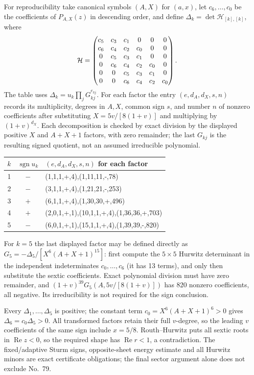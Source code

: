 \documentclass[11pt]{amsart}
\theoremstyle{remark}
\begin{document}
For reproducibility take canonical symbols $(A,X)$ for $(a,x)$, let $c_6,\ldots,c_0$ be the coefficients of $P_{A,X}(z)$ in descending order, and define $\Delta_k=\det\mathcal H_{[k],[k]}$, where
\[
\mathcal H=\begin{pmatrix}c_5&c_3&c_1&0&0&0\cr c_6&c_4&c_2&c_0&0&0\cr 0&c_5&c_3&c_1&0&0\cr 0&c_6&c_4&c_2&c_0&0\cr 0&0&c_5&c_3&c_1&0\cr 0&0&c_6&c_4&c_2&c_0\end{pmatrix}.
\]
The table uses $\Delta_k=u_k\prod_jG_{kj}^{e_{kj}}$. For each factor the entry $(e,d_A,d_X,s,n)$ records its multiplicity, degrees in $A,X$, common sign $s$, and number $n$ of nonzero coefficients after substituting $X=5v/[8(1+v)]$ and multiplying by $(1+v)^{d_X}$. Each decomposition is checked by exact division by the displayed positive $X$ and $A+X+1$ factors, with zero remainder; the last $G_{kj}$ is the resulting signed quotient, not an assumed irreducible polynomial.
\begin{center}\footnotesize
\begin{tabular}{c c p{9.4cm}}
$k$ & $\operatorname{sgn}u_k$ & $(e,d_A,d_X,s,n)$ for each factor 
\\
\hline
1 & $-$ & (1,1,1,+,4),(1,11,11,-,78) 
\\
2 & $-$ & (3,1,1,+,4),(1,21,21,-,253) 
\\
3 & $+$ & (6,1,1,+,4),(1,30,30,+,496) 
\\
4 & $+$ & (2,0,1,+,1),(10,1,1,+,4),(1,36,36,+,703) 
\\
5 & $-$ & (6,0,1,+,1),(15,1,1,+,4),(1,39,39,-,820) 
\\
\end{tabular}
\end{center}
For $k=5$ the last displayed factor may be defined directly as $G_5=-\Delta_5/[X^6(A+X+1)^{15}]$: first compute the $5\times5$ Hurwitz determinant in the independent indeterminates $c_0,\ldots,c_6$ (it has 13 terms), and only then substitute the sextic coefficients. Exact polynomial division must have zero remainder, and $(1+v)^{39}G_5(A,5v/[8(1+v)])$ has 820 nonzero coefficients, all negative. Its irreducibility is not required for the sign conclusion.

Every $\Delta_1,\ldots,\Delta_5$ is positive; the constant term $c_0=X^6(A+X+1)^6>0$ gives $\Delta_6=c_0\Delta_5>0$. All transformed factors retain their full $v$-degree, so the leading $v$ coefficients of the same sign include $x=5/8$. Routh--Hurwitz puts all sextic roots in $\operatorname{Re}z<0$, so the required shape has $\operatorname{Re}r<1$, a contradiction. The fixed/adaptive Sturm signs, opposite-sheet energy estimate and all Hurwitz minors are exact certificate obligations; the final sector argument alone does not exclude No.~79.
\end{document}
